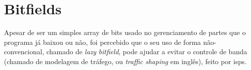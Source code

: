 
\section{Bitfields}
\label{sec:bitfield}

Apesar de ser um simples array de bits usado no gerenciamento de partes que o programa
já baixou ou não, foi percebido que o seu uso de forma não-convencional, chamado de
\emph{lazy bitfield}, pode ajudar a evitar o controle de banda (chamado de modelagem de
tráfego, ou \emph{traffic shaping} em inglês), feito por \glspl{isp}.